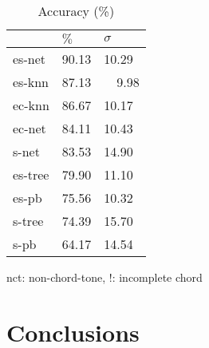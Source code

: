 \documentclass{article}
\begin{document}
\begin{table}
  \centering
  \begin{tabular}{l|p{.5cm}p{.5cm}}
       & $\%$     & $\sigma$ \\
\hline
es-net &   90.13  & 10.29    \\
es-knn &   87.13  & ~~9.98   \\
ec-knn &   86.67  & 10.17    \\
ec-net &   84.11  & 10.43    \\ 
s-net  &   83.53  & 14.90    \\
es-tree&   79.90  & 11.10    \\
es-pb  &   75.56  & 10.32    \\
s-tree &   74.39  & 15.70    \\
s-pb   &   64.17  & 14.54    \\

  \end{tabular}                                                        

\medskip

nct: non-chord-tone, !: incomplete chord
  \caption{Accuracy (\%)}
  \label{tab:accuracy}
\end{table}














\section{Conclusions}
\label{sec:conclusions}




\end{document}
